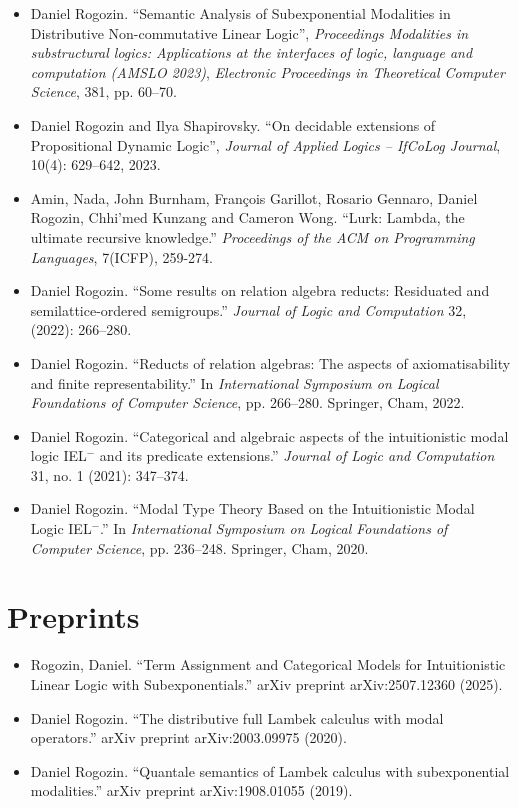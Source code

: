 \documentclass[11pt,a4paper]{article}
\begin{document}
\begin{itemize}[leftmargin=*]
    \item Daniel Rogozin. ``Semantic Analysis of Subexponential Modalities in Distributive Non-commutative Linear Logic'', \emph{Proceedings Modalities in substructural logics: Applications at the interfaces of logic, language and computation (AMSLO 2023)}, \emph{Electronic Proceedings in Theoretical Computer Science}, 381, pp. 60–70.
    \item Daniel Rogozin and Ilya Shapirovsky. ``On decidable extensions of Propositional Dynamic Logic'', \emph{Journal of Applied Logics – IfCoLog Journal}, 10(4): 629–642, 2023.
    \item Amin, Nada, John Burnham, François Garillot, Rosario Gennaro, Daniel Rogozin, Chhi'med Kunzang and Cameron Wong. ``Lurk: Lambda, the ultimate recursive knowledge.'' \emph{Proceedings of the ACM on Programming Languages}, 7(ICFP), 259-274.
    \item Daniel Rogozin. ``Some results on relation algebra reducts: Residuated and semilattice-ordered semigroups.'' \textit{Journal of Logic and Computation} 32, (2022): 266--280.
    \item Daniel Rogozin. ``Reducts of relation algebras: The aspects of axiomatisability and finite representability.'' In \textit{International Symposium on Logical Foundations of Computer Science}, pp. 266--280. Springer, Cham, 2022.
    \item Daniel Rogozin. ``Categorical and algebraic aspects of the intuitionistic modal logic IEL$^-$ and its predicate extensions.'' \textit{Journal of Logic and Computation} 31, no. 1 (2021): 347--374.
    \item Daniel Rogozin. ``Modal Type Theory Based on the Intuitionistic Modal Logic IEL$^-$.'' In \textit{International Symposium on Logical Foundations of Computer Science}, pp. 236--248. Springer, Cham, 2020.
\end{itemize}

\section{Preprints}

\begin{itemize}[leftmargin=*]
    \item Rogozin, Daniel. ``Term Assignment and Categorical Models for Intuitionistic Linear Logic with Subexponentials.'' arXiv preprint arXiv:2507.12360 (2025).
    \item Daniel Rogozin. ``The distributive full Lambek calculus with modal operators.'' arXiv preprint arXiv:2003.09975 (2020).
    \item Daniel Rogozin. ``Quantale semantics of Lambek calculus with subexponential modalities.'' arXiv preprint arXiv:1908.01055 (2019).
\end{itemize}
\end{document}
